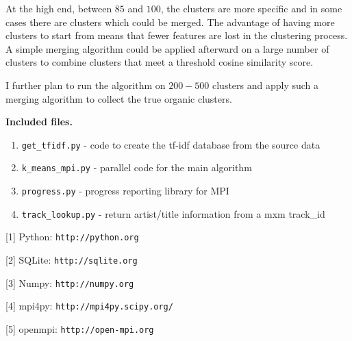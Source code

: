 \documentclass[11pt]{article}
\begin{document}
At the high end, between $85$ and $100$, the clusters are more specific and in
some cases there are clusters which could be merged. The advantage of having
more clusters to start from means that fewer features are lost in the clustering
process. A simple merging algorithm could be applied afterward on a large number of
clusters to combine clusters that meet a threshold cosine similarity score.

I further plan to run the algorithm on $200 - 500$ clusters and apply such a merging
algorithm to collect the true organic clusters.

\textbf{Included files.}
\begin{enumerate}
    \item \verb|get_tfidf.py| - code to create the tf-idf database from the source data
    \item \verb|k_means_mpi.py| - parallel code for the main algorithm
    \item \verb|progress.py| - progress reporting library for MPI
    \item \verb|track_lookup.py| - return artist/title information from a mxm track\_id
\end{enumerate}

[1] Python: \verb|http://python.org|

[2] SQLite: \verb|http://sqlite.org|

[3] Numpy: \verb|http://numpy.org|

[4] mpi4py: \verb|http://mpi4py.scipy.org/|

[5] openmpi: \verb|http://open-mpi.org|
\end{document}
